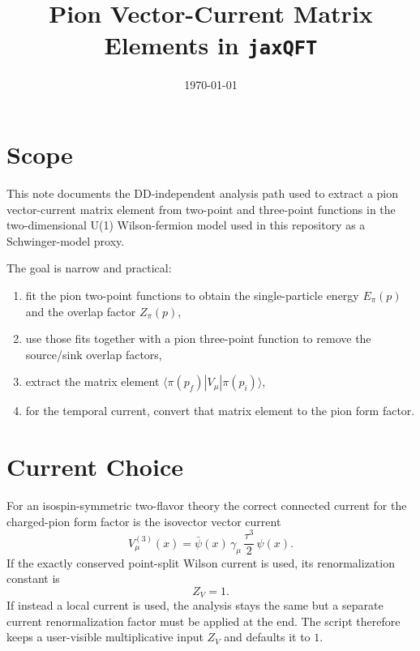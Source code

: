 \documentclass[11pt]{article}
\title{Pion Vector-Current Matrix Elements in \texttt{jaxQFT}}
\author{}
\date{\today}
\begin{document}
\maketitle

\section{Scope}
This note documents the DD-independent analysis path used to extract a pion
vector-current matrix element from two-point and three-point functions in the
two-dimensional U(1) Wilson-fermion model used in this repository as a
Schwinger-model proxy.

The goal is narrow and practical:
\begin{enumerate}
  \item fit the pion two-point functions to obtain the single-particle energy
  $E_\pi(p)$ and the overlap factor $Z_\pi(p)$,
  \item use those fits together with a pion three-point function to remove the
  source/sink overlap factors,
  \item extract the matrix element
  $\langle \pi(p_f)|V_\mu|\pi(p_i)\rangle$,
  \item for the temporal current, convert that matrix element to the pion form
  factor.
\end{enumerate}

\section{Current Choice}
For an isospin-symmetric two-flavor theory the correct connected current for the
charged-pion form factor is the isovector vector current
\begin{equation}
  V_\mu^{(3)}(x)
  =
  \bar\psi(x)\,\gamma_\mu\,\frac{\tau^3}{2}\,\psi(x).
\end{equation}
If the exactly conserved point-split Wilson current is used, its renormalization
constant is
\begin{equation}
  Z_V = 1.
\end{equation}
If instead a local current is used, the analysis stays the same but a separate
current renormalization factor must be applied at the end. The script therefore
keeps a user-visible multiplicative input $Z_V$ and defaults it to $1$.
\end{document}
